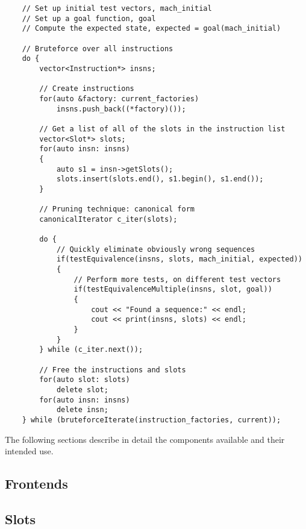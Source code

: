 \documentclass{article}
\begin{document}
\begin{verbatim}
    // Set up initial test vectors, mach_initial
    // Set up a goal function, goal
    // Compute the expected state, expected = goal(mach_initial)

    // Bruteforce over all instructions
    do {
        vector<Instruction*> insns;

        // Create instructions
        for(auto &factory: current_factories)
            insns.push_back((*factory)());

        // Get a list of all of the slots in the instruction list
        vector<Slot*> slots;
        for(auto insn: insns)
        {
            auto s1 = insn->getSlots();
            slots.insert(slots.end(), s1.begin(), s1.end());
        }

        // Pruning technique: canonical form
        canonicalIterator c_iter(slots);

        do {
            // Quickly eliminate obviously wrong sequences
            if(testEquivalence(insns, slots, mach_initial, expected))
            {
                // Perform more tests, on different test vectors
                if(testEquivalenceMultiple(insns, slot, goal))
                {
                    cout << "Found a sequence:" << endl;
                    cout << print(insns, slots) << endl;
                }
            }
        } while (c_iter.next());

        // Free the instructions and slots
        for(auto slot: slots)
            delete slot;
        for(auto insn: insns)
            delete insn;
    } while (bruteforceIterate(instruction_factories, current));

\end{verbatim}

The following sections describe in detail the components available and their intended use.

\subsection{Frontends}


\subsection{Slots}

\end{document}
